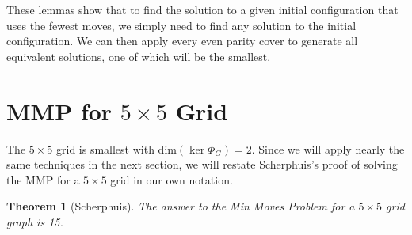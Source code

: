 \documentclass[a4paper]{article}
\newtheorem{theorem}{Theorem}
\renewcommand{\dim}[1]{\text{dim}\left( #1 \right)}
\begin{document}
	These lemmas show that to find the solution to a given initial configuration that uses the fewest moves, we simply need to find any solution to the initial configuration.
	We can then apply every even parity cover to generate all equivalent solutions, one of which will be the smallest.
		
	\section{MMP for $5 \times 5$ Grid}
	The $5 \times 5$ grid is smallest with $\dim{\ker{\Phi_G}} = 2$.
	Since we will apply nearly the same techniques in the next section, we will restate Scherphuis's proof of solving the MMP for a $5 \times 5$ grid in our own notation.
	\begin{theorem}[Scherphuis]\label{min-moves-problem-5x5}
		The answer to the Min Moves Problem for a $5 \times 5$ grid graph is 15.
	\end{theorem}
\end{document}
